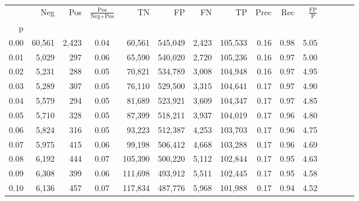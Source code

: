 \begin{tabular}{rrrcrrrrrrrrrrr}
\toprule
{} &     Neg &     Pos & $\frac{\text{Pos}}{\text{Neg}+\text{Pos}}$ &       TN &       FP &       FN &       TP &  Prec &   Rec & $\frac{\text{FP}}{\text{P}}$ \\
p    &         &         &                                            &          &          &          &          &       &       &                              \\
\midrule
0.00 &  60,561 &   2,423 &                                       0.04 &   60,561 &  545,049 &    2,423 &  105,533 &  0.16 &  0.98 &                         5.05 \\
0.01 &   5,029 &     297 &                                       0.06 &   65,590 &  540,020 &    2,720 &  105,236 &  0.16 &  0.97 &                         5.00 \\
0.02 &   5,231 &     288 &                                       0.05 &   70,821 &  534,789 &    3,008 &  104,948 &  0.16 &  0.97 &                         4.95 \\
0.03 &   5,289 &     307 &                                       0.05 &   76,110 &  529,500 &    3,315 &  104,641 &  0.17 &  0.97 &                         4.90 \\
0.04 &   5,579 &     294 &                                       0.05 &   81,689 &  523,921 &    3,609 &  104,347 &  0.17 &  0.97 &                         4.85 \\
0.05 &   5,710 &     328 &                                       0.05 &   87,399 &  518,211 &    3,937 &  104,019 &  0.17 &  0.96 &                         4.80 \\
0.06 &   5,824 &     316 &                                       0.05 &   93,223 &  512,387 &    4,253 &  103,703 &  0.17 &  0.96 &                         4.75 \\
0.07 &   5,975 &     415 &                                       0.06 &   99,198 &  506,412 &    4,668 &  103,288 &  0.17 &  0.96 &                         4.69 \\
0.08 &   6,192 &     444 &                                       0.07 &  105,390 &  500,220 &    5,112 &  102,844 &  0.17 &  0.95 &                         4.63 \\
0.09 &   6,308 &     399 &                                       0.06 &  111,698 &  493,912 &    5,511 &  102,445 &  0.17 &  0.95 &                         4.58 \\
0.10 &   6,136 &     457 &                                       0.07 &  117,834 &  487,776 &    5,968 &  101,988 &  0.17 &  0.94 &                         4.52 \\

\end{tabular}
